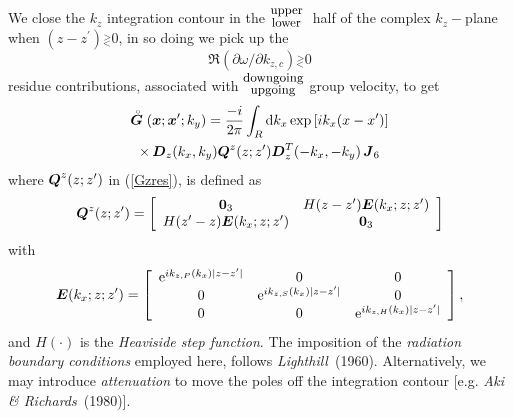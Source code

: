 \documentclass[11pt]{article}
\newcommand{\bmi}[1]{\mbox{\boldmath$\mit #1$\unboldmath}}
\newcommand{\rf}[1]{\stackrel{\scriptscriptstyle _{\,\,\circ}}{ #1}}
\newcommand{\gtlt}[0]{\stackrel{\scriptscriptstyle >}{\scriptscriptstyle _<}}
\begin{document}
We  close the
$k_z$ integration contour
in the ${\stackrel{{\mbox{{\small upper }}}}{{}_{\mbox{{\small lower }}}}}$ half of the
complex ${k}_{z}-$plane when
$(z-{z}^{\prime})\gtlt0$, in so doing  we pick up the
\[
\Re(\partial \omega/\partial { k}_{z,c})\gtlt 0
\]
residue contributions, associated with
${\stackrel{\mbox{\small downgoing}}{{}_{\mbox{\small upgoing}}}}$
group velocity, to get
\begin{multline} \label{Gzres}
\rf{\bmi  G}({\bmi x};{\bmi x}^{\prime};k_y)=\frac{- i}{2 \pi}
\int_{R} {\rm d}{ k}_{x} \exp \left[i { k}_{x} ({ x}-{
x}^{\prime})\right] \\
\times\, {\bmi  D}_{z}({k}_{x},{k}_{y})
{\bmi Q}^{z}(z;z^{\prime}){\bmi  D}_{z}^{T}(-{k}_{x},-{k}_{y})
\,{\bmi  J}_6
\end{multline}
where
${\bmi Q}^{z}(z;z^{\prime})$ in (\ref{Gzres}),
is defined  as
\begin{equation} \label{Qzdef}
{\bmi Q}^{z}(z;z^{\prime})=
\left[{\begin{array}{cc}{\bf 0}_{3}&H(z-{z}^{\prime}){\bmi E}(k_x;z;{z}^{\prime})\\
H(z^{\prime}-{z}){\bmi E}(k_x;z;{z}^{\prime})&{\bf 0}_{3}\end{array}}\right]
\end{equation}
with
\begin{equation} \label{Ek1def}
{\bmi E}(k_x;z;{z}^{\prime})=\left[{\begin{array}{ccc}
{\rm e}^{i{ k}_{z,P}(k_{x})|z-{z}^{\prime}|}&{ 0}&{ 0}\\
{ 0}&{\rm e}^{
i{ k}_{z,S}(k_{x})|z-{z}^{\prime}|}&{ 0}\\ { 0}&{ 0}&{\rm e}^{
i{ k}_{z,H}(k_{x})|z-{z}^{\prime}|}\end{array}}\right] ,
\end{equation}
and $H(\cdot)$ is the {\em Heaviside step function\/}.
The imposition of the {\em radiation boundary conditions\/} employed here,
follows {\em Lighthill}~(1960). Alternatively,  we may
 introduce {\em attenuation\/} to move the
poles off the integration contour [e.g. {\em Aki \& Richards\/}~(1980)].
\end{document}
